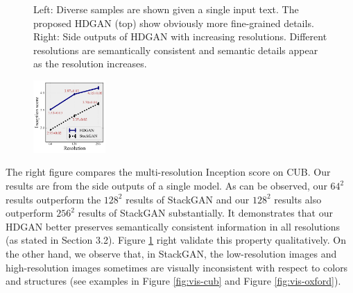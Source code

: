 \documentclass[10pt,twocolumn,letterpaper]{article}
\begin{document}
\begin{figure}[t]
\begin{subfigure}[t]{0.3\textwidth}
    \end{subfigure}
    \vspace{-.2cm}
    \caption{Left: Diverse samples are shown given a single input text. The proposed HDGAN (top) show obviously more fine-grained details. Right: Side outputs of HDGAN with increasing resolutions. Different resolutions are semantically consistent and semantic details appear as the resolution increases.  \label{fig:multiple-test}}     \vspace{-.3cm}
\end{figure}


\begingroup
\setlength{\intextsep}{-4pt}%
\setlength{\columnsep}{0pt}%
\begin{figure}
    \centering
    \includegraphics[width=0.245\textwidth]{figure/multiscale_inception_2.pdf}
    \vspace{-12pt}
\end{figure}
The right figure compares the multi-resolution Inception score on CUB. Our results are from the side outputs of a single model. As can be observed, our $64^2$ results outperform the $128^2$ results of StackGAN and our $128^2$ results also outperform $256^2$ results of StackGAN substantially. It demonstrates that our HDGAN better preserves semantically consistent information in all resolutions (as stated in Section 3.2). Figure \ref{fig:multiple-test} right validate this property qualitatively. On the other hand, we observe that, in StackGAN, the low-resolution images and high-resolution images sometimes are visually inconsistent with respect to colors and structures (see examples in Figure \ref{fig:vis-cub} and Figure \ref{fig:vis-oxford}).
\end{document}
